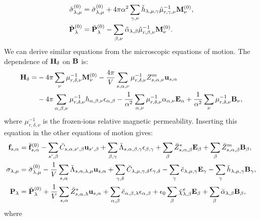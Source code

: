 \documentclass[12pt,a4paper]{article}
\begin{document}
{\begin{align}
\check \sigma^{(0)}_{\lambda,\mu} &= \tilde \sigma^{(0)}_{\lambda,\mu}
+ 4 \pi \alpha^2 \sum_{\gamma,\nu} \tilde h_{\lambda,\mu,\gamma} 
\tilde \mu^{-1}_{r,\gamma,\nu} {\bf M}^{(0)}_\nu,  \\
\check {\bf P}^{(0)}_{\lambda} &= \tilde {\bf P}^{(0)}_{\lambda}
- \sum_{\beta,\nu} \tilde \alpha_{\lambda,\beta} 
\tilde \mu^{-1}_{r,\beta,\nu} {\bf M}^{(0)}_\nu. 
\end{align}
We can derive similar equations from the microscopic equations of motion.
The dependence of ${\bf H}_\delta$ on ${\bf B}$ is:
\begin{align}
{\bf H}_\delta = 
&- 4 \pi \sum_\nu \mu^{-1}_{r,\delta,\nu} {\bf M}^{(0)}_\nu 
-{4 \pi \over V} \sum_{s,\alpha,\nu} \mu^{-1}_{r,\delta,\nu} Z^m_{s,\alpha,\nu}
{\bf u}_{s,\alpha} \nonumber\\
&- 4 \pi \sum_{\alpha,\beta,\nu} \mu^{-1}_{r,\delta,\nu} h_{\alpha,\beta,\nu}
\epsilon_{\alpha,\beta} - {1\over \alpha^2} \sum_{\alpha,\nu}
\mu^{-1}_{r,\delta,\nu} \alpha_{\alpha,\nu} {\bf E}_\alpha
+ {1\over \alpha^2} \sum_\nu \mu^{-1}_{r,\delta,\nu} {\bf B}_\nu, 
\end{align}
where $\mu^{-1}_{r,\delta,\nu}$ is the frozen-ions relative magnetic
permeability.
Inserting this equation in the other equations of motion gives:
\begin{align}
{\bf f}_{s,\alpha}&= \breve{\bf f}^{(0)}_{s,\alpha}
-\sum_{s',\beta} \breve C_{s,\alpha,s',\beta} {\bf u}_{s',\beta}
+\sum_{\beta,\gamma}
\breve \Lambda_{s,\alpha,\beta,\gamma} 
\epsilon_{\beta,\gamma} +
\sum_{\beta} \breve Z^*_{s,\alpha,\beta} {\bf E}_{\beta}
+\sum_{\beta} 
\breve Z^m_{s,\alpha,\beta} {\bf B}_{\beta}, \\
\sigma_{\lambda,\mu}&= \breve  \sigma_{\lambda,\mu}^{(0)}
-{1\over V} \sum_{s,\alpha}
\breve \Lambda_{s,\alpha,\lambda,\mu} {\bf u}_{s,\alpha}
+\sum_{\gamma,\delta} \breve C_{\lambda,\mu,\gamma,\delta}  
\epsilon_{\gamma,\delta} -
\sum_{\gamma} \breve e_{\lambda,\mu,\gamma} 
 {\bf E}_{\gamma}
-\sum_{\gamma}  \breve h_{\lambda,\mu,\gamma} 
{\bf B}_{\gamma}, \\
{\bf P}_{\lambda}&= \breve {\bf P}^{(0)}_{\lambda}
+{1\over V} \sum_{s,\alpha} \breve Z^*_{s,\alpha,\lambda} 
{\bf u}_{s,\alpha} +
\sum_{\alpha,\beta} \breve e_{\alpha,\beta,\lambda} 
\epsilon_{\alpha,\beta} +
\epsilon_0 \sum_{\beta} 
\breve \chi^e_{\lambda,\beta}
{\bf E}_{\beta} +
\sum_{\beta} \breve \alpha_{\lambda,\beta} 
{\bf B}_{\beta}, 
\end{align}
where
}
\end{document}
